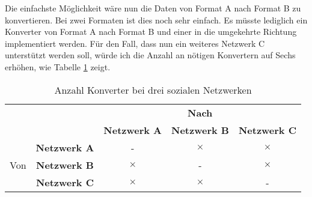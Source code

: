 \medskip

Die einfachste Möglichkeit wäre nun die Daten von Format A nach Format B zu konvertieren. Bei zwei Formaten ist dies noch sehr einfach. Es müsste lediglich ein Konverter von Format A nach Format B und einer in die umgekehrte Richtung implementiert werden. Für den Fall, dass nun ein weiteres Netzwerk C unterstützt werden soll, würde ich die Anzahl an nötigen Konvertern auf Sechs erhöhen, wie Tabelle \ref{tbl:anzahl_konvertern_bei_drei_netzwerken} zeigt. 

 \medskip


    

\begin{table}[ht]
    \centering
    \caption{Anzahl Konverter bei drei sozialen Netzwerken}
    
    \begin{tabular}{c|c|c|c|c}
        \multicolumn{2}{c|}{\multirow{2}{*}{}} & 
        \multicolumn{3}{|c}{\textbf{Nach}}   \\ 
        \cline{3-5} 

        \multicolumn{2}{c|}{} & 
        \textbf{Netzwerk A} & 
        \textbf{Netzwerk B} & 
        \textbf{Netzwerk C} \\ 
        \hline

        \multirow{3}{*}{Von} & 
        \textbf{Netzwerk A} & 
        -&            
        $ \times $ &            
        $ \times $ \\ 
        \cline{2-5} 

        & 
        \textbf{Netzwerk B} &            
        $ \times $ &            
        -&            
        $ \times $ \\ 
        \cline{2-5} 
         
        & 
        \textbf{Netzwerk C} &            
        $ \times $ &            
        $ \times $ &            
        -\\
    \end{tabular}
    \label{tbl:anzahl_konvertern_bei_drei_netzwerken}
\end{table}

